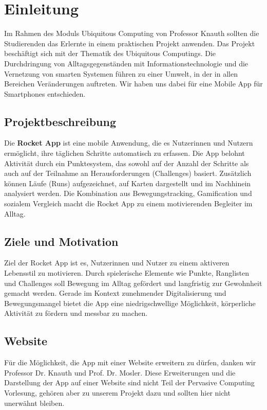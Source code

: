 \documentclass[11pt,a4paper]{article}
\begin{document}
\tableofcontents

\newpage
{}
\listoffigures
\newpage

\section{Einleitung}
Im Rahmen des Moduls Ubiquitous Computing von Professor Knauth sollten die
Studierenden das Erlernte in einem praktischen Projekt anwenden.
Das Projekt beschäftigt sich mit der Thematik des Ubiquitous Computings. Die
Durchdringung von Alltagsgegenständen mit Informationstechnologie und die
Vernetzung von smarten Systemen führen zu einer Umwelt, in der in allen Bereichen
Veränderungen auftreten. Wir haben uns dabei für eine Mobile App für Smartphones entschieden.

\subsection{Projektbeschreibung}
Die \textbf{Rocket App} ist eine mobile Anwendung, die es Nutzerinnen und Nutzern ermöglicht, ihre täglichen Schritte automatisch zu erfassen. Die App belohnt Aktivität durch ein Punktesystem, das sowohl auf der Anzahl der Schritte als auch auf der Teilnahme an Herausforderungen (Challenges) basiert. Zusätzlich können Läufe (Runs) aufgezeichnet, auf Karten dargestellt und im Nachhinein analysiert werden. Die Kombination aus Bewegungstracking, Gamification und sozialem Vergleich macht die Rocket App zu einem motivierenden Begleiter im Alltag.

\subsection{Ziele und Motivation}
Ziel der Rocket App ist es, Nutzerinnen und Nutzer zu einem aktiveren Lebensstil zu motivieren. Durch spielerische Elemente wie Punkte, Ranglisten und Challenges soll Bewegung im Alltag gefördert und langfristig zur Gewohnheit gemacht werden. Gerade im Kontext zunehmender Digitalisierung und Bewegungsmangel bietet die App eine niedrigschwellige Möglichkeit, körperliche Aktivität zu fördern und messbar zu machen.

\subsection{Website}
Für die Möglichkeit, die App mit einer Website erweitern zu dürfen, danken wir Professor Dr. Knauth und Prof. Dr. Mosler.
Diese Erweiterungen und die Darstellung der App auf einer Website sind nicht Teil der Pervasive Computing Vorlesung, gehören aber zu unserem Projekt dazu und sollten hier nicht unerwähnt bleiben.
\end{document}
